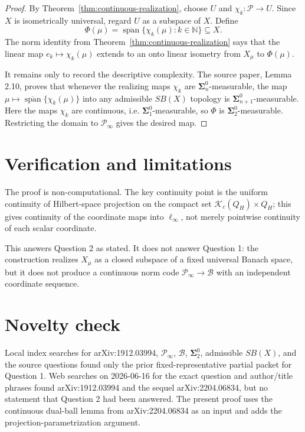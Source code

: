 \documentclass[11pt]{article}
\newcommand{\PP}{\mathcal P}
\newcommand{\BB}{\mathcal B}
\newcommand{\Nat}{\mathbb N}
\newcommand{\closedSpan}{\overline{\operatorname{span}}}
\newcommand{\K}{\mathcal K}
\begin{document}
\begin{proof}
By Theorem~\ref{thm:continuous-realization}, choose \(U\) and
\(\chi_k:\PP\to U\). Since \(X\) is isometrically universal, regard \(U\) as a
subspace of \(X\). Define
\[
\Phi(\mu)=\closedSpan\{\chi_k(\mu):k\in\Nat\}\subseteq X.
\]
The norm identity from Theorem~\ref{thm:continuous-realization} says that the
linear map \(e_k\mapsto\chi_k(\mu)\) extends to an onto linear isometry from
\(X_\mu\) to \(\Phi(\mu)\).

It remains only to record the descriptive complexity. The source paper,
Lemma 2.10, proves that whenever the realizing maps \(\chi_k\) are
\(\boldsymbol{\Sigma}^0_n\)-measurable, the map
\(\mu\mapsto\closedSpan\{\chi_k(\mu)\}\) into any admissible \(SB(X)\)
topology is \(\boldsymbol{\Sigma}^0_{n+1}\)-measurable. Here the maps
\(\chi_k\) are continuous, i.e. \(\boldsymbol{\Sigma}^0_1\)-measurable, so
\(\Phi\) is \(\boldsymbol{\Sigma}^0_2\)-measurable. Restricting the domain to
\(\PP_\infty\) gives the desired map.
\end{proof}

\section*{Verification and limitations}

The proof is non-computational. The key continuity point is the uniform
continuity of Hilbert-space projection on the compact set
\(\K_c(Q_H)\times Q_H\); this gives continuity of the coordinate maps into
\(\ell_\infty\), not merely pointwise continuity of each scalar coordinate.

This answers Question 2 as stated. It does not answer Question 1: the
construction realizes \(X_\mu\) as a closed subspace of a fixed universal
Banach space, but it does not produce a continuous norm code
\(\PP_\infty\to\BB\) with an independent coordinate sequence.

\section*{Novelty check}

Local index searches for arXiv:1912.03994, \(\PP_\infty\), \(\BB\),
\(\boldsymbol{\Sigma}^0_2\), admissible \(SB(X)\), and the source questions
found only the prior fixed-representative partial packet for Question 1.
Web searches on 2026-06-16 for the exact question and author/title phrases
found arXiv:1912.03994 and the sequel arXiv:2204.06834, but no statement that
Question 2 had been answered. The present proof uses the continuous
dual-ball lemma from arXiv:2204.06834 as an input and adds the
projection-parametrization argument.
\end{document}
